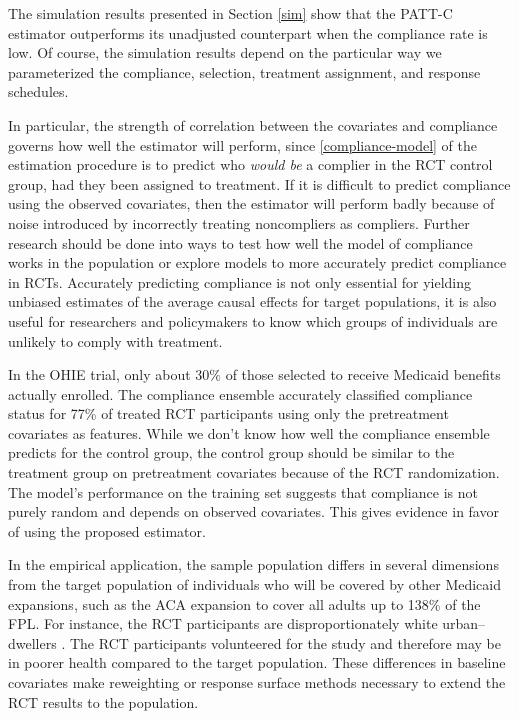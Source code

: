 \documentclass[hidelinks,12pt]{article}
\begin{document}
The simulation results presented in Section \ref{sim} show that the PATT-C estimator outperforms its unadjusted counterpart when the compliance rate is low. Of course, the simulation results depend on the particular way we parameterized the compliance, selection, treatment assignment, and response schedules. 

In particular, the strength of correlation between the covariates and compliance governs how well the estimator will perform, since \ref{compliance-model} of the estimation procedure is to predict who \textit{would be} a complier in the RCT control group, had they been assigned to treatment. If it is difficult to predict compliance using the observed covariates, then the estimator will perform badly because of noise introduced by incorrectly treating noncompliers as compliers. Further research should be done into ways to test how well the model of compliance works in the population or explore models to more accurately predict compliance in RCTs.  Accurately predicting compliance is not only essential for yielding unbiased estimates of the average causal effects for target populations, it is also useful for researchers and policymakers to know which groups of individuals are unlikely to comply with treatment. 

In the OHIE trial, only about $30\%$ of those selected to receive Medicaid benefits actually enrolled. The compliance ensemble accurately classified compliance status for 77\% of treated RCT participants using only the pretreatment covariates as features. While we don't know how well the compliance ensemble predicts for the control group, the control group should be similar to the treatment group on pretreatment covariates because of the RCT randomization. The model's performance on the training set suggests that compliance is not purely random and depends on observed covariates. This gives evidence in favor of using the proposed estimator. 

In the empirical application, the sample population differs in several dimensions from the target population of individuals who will be covered by other Medicaid expansions, such as the ACA expansion to cover all adults up to 138\% of the FPL. For instance, the RCT participants are disproportionately white urban--dwellers \citep{Taubman}. The RCT participants volunteered for the study and therefore may be in poorer health compared to the target population. These differences in baseline covariates make reweighting or response surface methods necessary to extend the RCT results to the population.
\end{document}
